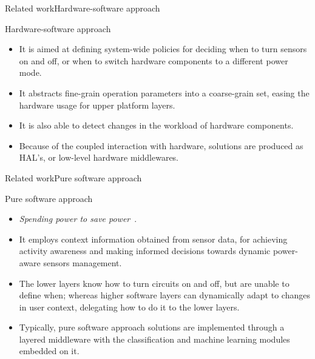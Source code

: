\documentclass[9pt,xcolor={dvipsnames},handout]{beamer}
\begin{document}
\begin{frame}{Related work}{Hardware-software approach}
\begin{exampleblock}{Hardware-software approach}
\begin{itemize}
  \item It is aimed at defining system-wide policies for deciding when to turn sensors on and off, or when to switch hardware components to a different power mode.
  \item It abstracts fine-grain operation parameters into a coarse-grain set, easing the hardware usage for upper platform layers.
  \item It is also able to detect changes in the workload of hardware components.
  \item Because of the coupled interaction with hardware, solutions are produced as HAL's, or low-level hardware middlewares.
\end{itemize}
\end{exampleblock}
\end{frame}

\begin{frame}{Related work}{Pure software approach}
\begin{exampleblock}{Pure software approach}
\begin{itemize}
  \item \emph{Spending power to save power}~\cite{Ranganathan2010}.
  \item It employs context information obtained from sensor data, for achieving activity awareness and making informed decisions towards dynamic power-aware sensors management.
  \item The lower layers know how to turn circuits on and off, but are unable to define when; whereas higher software layers can dynamically adapt to changes in user context, delegating how to do it to the lower layers.
  \item Typically, pure software approach solutions are implemented through a layered middleware with the classification and machine learning modules embedded on it.
\end{itemize}
\end{exampleblock}
\end{frame}
\end{document}
